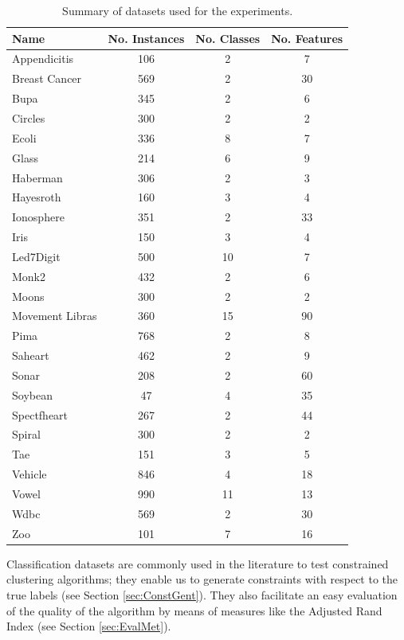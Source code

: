 \documentclass[review]{elsarticle}
\begin{document}
\begin{table}[!h]
	\centering
	\small
	\begin{tabular}{l c c c}
		\hline
		Name & No. Instances & No. Classes & No. Features \\
		\hline
		Appendicitis & 106 & 2 & 7 \\
		Breast Cancer & 569 & 2 & 30 \\
		Bupa & 345 & 2 & 6 \\
		Circles & 300 & 2 & 2 \\
		Ecoli & 336 & 8 & 7 \\
		Glass & 214 & 6 & 9 \\
		Haberman & 306 & 2 & 3 \\
		Hayesroth & 160 & 3 & 4 \\
		Ionosphere & 351 & 2 & 33 \\
		Iris & 150 & 3 & 4 \\
		Led7Digit & 500 & 10 & 7 \\
		Monk2 & 432 & 2 & 6 \\
		Moons & 300 & 2 & 2 \\
		Movement Libras & 360 & 15 & 90 \\
		Pima & 768 & 2 & 8 \\
		Saheart & 462 & 2 & 9 \\
		Sonar & 208 & 2 & 60 \\
		Soybean & 47 & 4 & 35 \\
		Spectfheart & 267 & 2 & 44 \\
		Spiral & 300 & 2 & 2 \\
		Tae & 151 & 3 & 5 \\
		Vehicle & 846 & 4 & 18 \\
		Vowel & 990 & 11 & 13 \\
		Wdbc & 569 & 2 & 30 \\
		Zoo & 101 & 7 & 16 \\
		\hline

	\end{tabular}%
	\caption{Summary of datasets used for the experiments.}
	\label{tab:datasets}
\end{table}

Classification datasets are commonly used in the literature to test constrained clustering algorithms; they enable us to generate constraints with respect to the true labels (see Section \ref{sec:ConstGent}). They also facilitate an easy evaluation of the quality of the algorithm by means of measures like the Adjusted Rand Index (see Section \ref{sec:EvalMet}).
\end{document}
